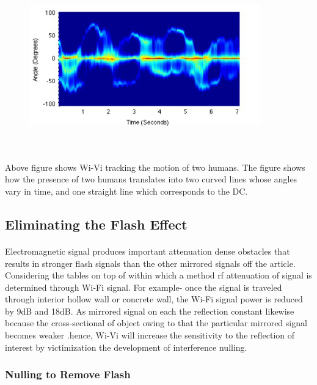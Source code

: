 \documentclass[a4paper,12pt,oneside]{article}
\begin{document}
\begin{figure}[H]
\centering
\includegraphics[height=7cm,width=10cm]{8.png}
\end{figure}
\paragraph{}
Above figure shows Wi-Vi tracking the motion of two humans. The figure shows how the presence
of two humans translates into two curved lines whose angles vary in time, and one straight
line which corresponds to the DC.

\subsection{Eliminating the Flash Effect}
\paragraph{}
Electromagnetic signal produces important attenuation dense obstacles that results in
stronger flash signals than the other mirrored signals off the article. Considering the tables on top
of within which a method rf attenuation of signal is determined through Wi-Fi signal. For
example- once the signal is traveled through interior hollow wall or concrete wall, the Wi-Fi
signal power is reduced by 9dB and 18dB. As mirrored signal on each the reflection constant
likewise because the cross-sectional of object owing to that the particular mirrored signal
becomes weaker .hence, Wi-Vi will increase the sensitivity to the reflection of interest by
victimization the development of interference nulling.
\subsubsection{Nulling to Remove Flash}
\end{document}
